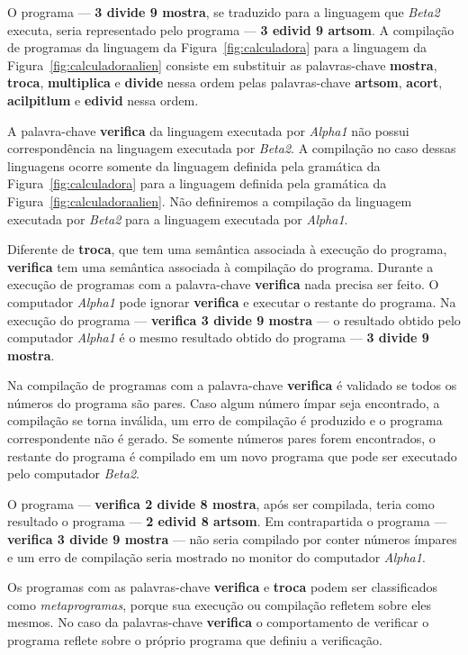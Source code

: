 O programa --- \textbf{3 divide 9 mostra}, se traduzido para a linguagem que \emph{Beta2} executa, seria representado pelo programa --- \textbf{3 edivid 9 artsom}. A compilação de programas da linguagem da Figura~\ref{fig:calculadora} para a linguagem da Figura~\ref{fig:calculadoraalien} consiste em substituir as palavras-chave \textbf{mostra}, \textbf{troca}, \textbf{multiplica} e \textbf{divide} nessa ordem pelas palavras-chave \textbf{artsom}, \textbf{acort}, \textbf{acilpitlum} e \textbf{edivid} nessa ordem.

A palavra-chave \textbf{verifica} da linguagem executada por \emph{Alpha1} não possui correspondência na linguagem executada por \emph{Beta2}. A compilação no caso dessas linguagens ocorre somente da linguagem definida pela gramática da Figura~\ref{fig:calculadora} para a linguagem definida pela gramática da Figura~\ref{fig:calculadoraalien}. Não definiremos a compilação da linguagem executada por \emph{Beta2} para a linguagem executada por \emph{Alpha1}. 

Diferente de \textbf{troca}, que tem uma semântica associada à execução do programa, \textbf{verifica} tem uma semântica associada à compilação do programa. Durante a execução de programas com a palavra-chave \textbf{verifica} nada precisa ser feito. O computador \emph{Alpha1} pode ignorar \textbf{verifica} e executar o restante do programa. Na execução do programa --- \textbf{verifica 3 divide 9 mostra} --- o resultado obtido pelo computador \emph{Alpha1} é o mesmo resultado obtido do programa --- \textbf{3 divide 9 mostra}.

Na compilação de programas com a palavra-chave \textbf{verifica} é validado se todos os números do programa são pares. Caso algum número ímpar seja encontrado, a compilação se torna inválida, um erro de compilação é produzido e o programa correspondente não é gerado. Se somente números pares forem encontrados, o restante do programa é compilado em um novo programa que pode ser executado pelo computador \emph{Beta2}.

O programa --- \textbf{verifica 2 divide 8 mostra}, após ser compilada, teria como resultado o programa --- \textbf{2 edivid 8 artsom}. Em contrapartida o programa --- \textbf{verifica 3 divide 9 mostra} --- não seria compilado por conter números ímpares e um erro de compilação seria mostrado no monitor do computador \emph{Alpha1}.
 
Os programas com as palavras-chave \textbf{verifica} e \textbf{troca} podem ser classificados como \emph{metaprogramas}, porque sua execução ou compilação refletem sobre eles mesmos. No caso da palavras-chave \textbf{verifica} o comportamento de verificar o programa reflete sobre o próprio programa que definiu a verificação.

